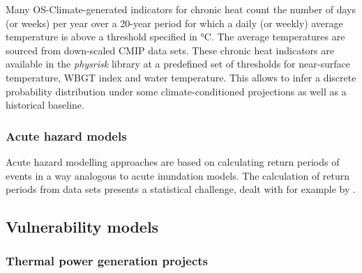 \documentclass[a4paper,11pt]{extarticle} %
\theoremstyle{definition}
\begin{document}
Many OS-Climate-generated indicators for chronic heat count the number of days (or weeks) per year over a 20-year period for which a daily (or weekly) average temperature is above a threshold specified in °C. The average temperatures are sourced from down-scaled \gls{CMIP} data sets. These chronic heat indicators are available in the \emph{physrisk} library at a predefined set of thresholds for near-surface temperature, WBGT index and water temperature. This allows to infer a discrete probability distribution under some climate-conditioned projections as well as a historical baseline.

\subsubsection{Acute hazard models}
Acute hazard modelling approaches are based on calculating return periods of events in a way analogous to acute inundation models. The calculation of return periods from data sets presents a statistical challenge, dealt with for example by \cite{MentaschiEtAl:2016}.

\subsection{Vulnerability models}

\setcounter{secnumdepth}{4}
\subsubsection{Thermal power generation projects}
\end{document}
